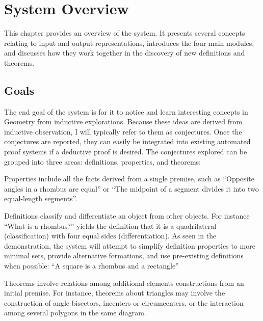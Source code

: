 \chapter{System Overview}
\label{chap:sys-overview}

This chapter provides an overview of the system. It presents several
concepts relating to input and output representations, introduces the
four main modules, and discusses how they work together in the
discovery of new definitions and theorems.

\section{Goals}

The end goal of the system is for it to notice and learn interesting
concepts in Geometry from inductive explorations. Because these ideas
are derived from inductive observation, I will typically refer to them
as conjectures. Once the conjectures are reported, they can easily be
integrated into existing automated proof systems if a deductive proof
is desired. The conjectures explored can be grouped into three areas:
definitions, properties, and theorems:

\begin{description}

\enlargethispage*{-\baselineskip}

\item[Properties] Properties include all the facts derived from a
  single premise, such as ``Opposite angles in a rhombus are equal''
  or ``The midpoint of a segment divides it into two equal-length
  segments''.

\item[Definitions] Definitions classify and differentiate an object
  from other objects. For instance ``What is a rhombus?'' yields the
  definition that it is a quadrilateral (classification) with four
  equal sides (differentiation). As seen in the demonstration, the
  system will attempt to simplify definition properties to more
  minimal sets, provide alternative formations, and use pre-existing
  definitions when possible: ``A square is a rhombus and a rectangle''

\item[Theorems] Theorems involve relations among additional elements
  constructions from an initial premise. For instance, theorems about
  triangles may involve the construction of angle bisectors, incenters
  or circumcenters, or the interaction among several polygons in the
  same diagram.

\end{description}

